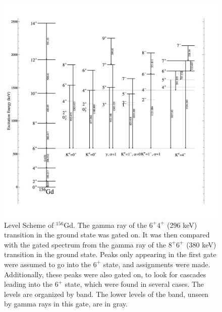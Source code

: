 \begin{figure}
    \centering
    \includegraphics[scale=0.28]{156GdTablesAndFigs/156Gd_6to4.png}
    \caption{Level Scheme of $^{156}$Gd. The gamma ray of the $6^+$\rightarrow$4^+$ (296 keV) transition in the ground state was gated on. It was then compared with the gated spectrum from the gamma ray of the $8^+$\rightarrow$6^+$ (380 keV) transition in the ground state. Peaks only appearing in the first gate were assumed to go into the $6^+$ state, and assignments were made. Additionally, these peaks were also gated on, to look for cascades leading into the $6^+$ state, which were found in several cases. The levels are organized by band. The lower levels of the band, unseen by gamma rays in this gate, are in gray.}
    \label{fig:156_6to4}
\end{figure}
